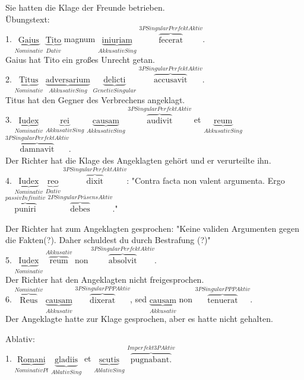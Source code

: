 \documentclass[a4paper]{article}
\newcommand{\ann}[2]{$\underbrace{\text{#1}}_{#2}$}
\newcommand{\ovv}[2]{$\overbrace{\text{#1}}^{#2}$}
\begin{document}
Sie hatten die Klage der Freunde betrieben. \\

Übungstext: \\

1. \ann{Gaius}{Nominativ} \ann{Tito}{Dativ} magnum \ann{iniuriam}{Akkusativ Sing} \ovv{fecerat}{3P Singular Perfekt Aktiv}. \\

Gaius hat Tito ein großes Unrecht getan. \\

2. \ann{Titus}{Nominativ} \ann{adversarium}{Akkusativ Sing} \ann{delicti}{Genetiv Singular} \ovv{accusavit}{3P Singular Perfekt Aktiv}. \\

Titus hat den Gegner des Verbrechens angeklagt. \\

3. \ann{Iudex}{Nominativ} \ann{rei}{Akkusativ Sing} \ann{causam}{Akkusativ Sing} \ovv{audivit}{3P Singular Perfekt Aktiv} et \ann{reum}{Akkusativ Sing} \ovv{damnavit}{3P Singular Perfekt Aktiv}. \\

Der Richter hat die Klage des Angeklagten gehört und er verurteilte ihn.\\

4. \ann{Iudex}{Nominativ} \ann{reo}{Dativ} \ovv{dixit}{3P Singular Perfekt Aktiv}: "Contra facta non valent argumenta. Ergo \ovv{puniri}{passiv Infinitiv} \ovv{debes}{2P Singular Präsens Aktiv}."

Der Richter hat zum Angeklagten gesprochen: "Keine validen Argumenten gegen die Fakten(?). Daher schuldest du durch Bestrafung (?)" \\

5. \ann{Iudex}{Nominativ} \ovv{reum}{Akkusativ} non \ovv{absolvit}{3P Singular Perfekt Aktiv}. \\ 

Der Richter hat den Angeklagten nicht freigesprochen. \\

6. \ovv{Reus}{Nominativ} \ann{causam}{Akkusativ} \ovv{dixerat}{3P Singular PPP Aktiv}, sed \ann{causam}{Akkusativ} non \ovv{tenuerat}{3P Singular PPP Aktiv}. \\

Der Angeklagte hatte zur Klage gesprochen, aber es hatte nicht gehalten.

Ablativ: \\

1. \ann{Romani}{Nominativ Pl} \ann{gladiis}{Ablativ Sing} et \ann{scutis}{Ablativ Sing} \ovv{pugnabant.}{Imperfekt 3P Aktiv} \\
\end{document}
